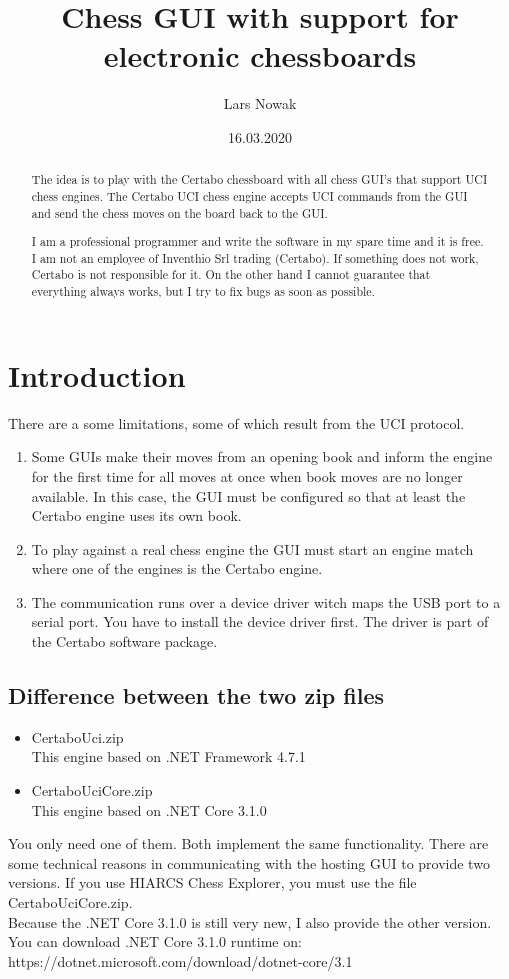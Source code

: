 \documentclass[11pt,a4paper]{article}
\title{Chess GUI with support for electronic chessboards}
\author{Lars Nowak}
\date{16.03.2020}
\begin{document}
\maketitle

\begin{abstract}
The idea is to play with the Certabo chessboard with all chess GUI’s that support UCI chess engines. The Certabo UCI chess engine accepts UCI commands from the GUI and send the chess moves on the board back to the GUI.

I am a professional programmer and write the software in my spare time and it is free. I am not an employee of Inventhio Srl trading (Certabo). If something does not work, Certabo is not responsible for it. On the other hand I cannot guarantee that everything always works, but I try to fix bugs as soon as possible.
\end{abstract}

\newpage
\tableofcontents
\newpage

\section{Introduction}

There are a some limitations, some of which result from the UCI protocol.

\begin{enumerate}
	\item Some GUIs make their moves from an opening book and inform the engine for the first time for all moves at once when book moves are no longer available. In this case, the GUI must be configured so that at least the Certabo engine uses its own book.
	\item To play against a real chess engine the GUI must start an engine match where one of the engines is the Certabo engine.
	\item The communication runs over a device driver witch maps the USB port to a serial port. You have to install the device driver first. The driver is part of the Certabo software package.
\end{enumerate}

\subsection{Difference between the two zip files}
\begin{itemize}
\item CertaboUci.zip\\
This engine based on .NET Framework 4.7.1
\item CertaboUciCore.zip\\
This engine based on .NET Core 3.1.0
\end{itemize}
You only need one of them. Both implement the same functionality.
There are some technical reasons in communicating with the hosting GUI to provide two versions. 
If you use HIARCS Chess Explorer, you must use the file CertaboUciCore.zip.\\
Because the .NET Core 3.1.0 is still very new, I also provide the other version. You can download .NET Core 3.1.0 runtime on:\\ https://dotnet.microsoft.com/download/dotnet-core/3.1
\end{document}
